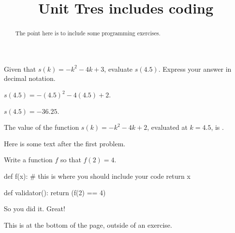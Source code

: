 \documentclass{ximera}
\title{Unit Tres includes coding}
\begin{document}
\begin{abstract}
  The point here is to include some programming exercises.
\end{abstract}

\begin{exercise}
Given that $s(k)=-k^2-4 k+3$, evaluate $s(4.5)$. Express your answer in decimal notation.
\begin{solution}
\begin{hint}
$s(4.5)=-(4.5)^2-4 (4.5)+2$.
\end{hint}
\begin{hint}
$s(4.5)=-36.25$.
\end{hint}
The value of the function $s(k)=-k^2-4 k+2$, evaluated at $k=4.5$, is .
\end{solution}

Here is some text after the first problem.
\end{exercise}

\begin{exercise}
Write a function $f$ so that $f(2) = 4$.

\begin{solution}
\begin{python}
def f(x):
  # this is where you should include your code
  return x

def validator():
  return (f(2) == 4)
\end{python}
\end{solution}

So you did it.  Great!
\end{exercise}

This is at the bottom of the page, outside of an exercise.
\end{document}
